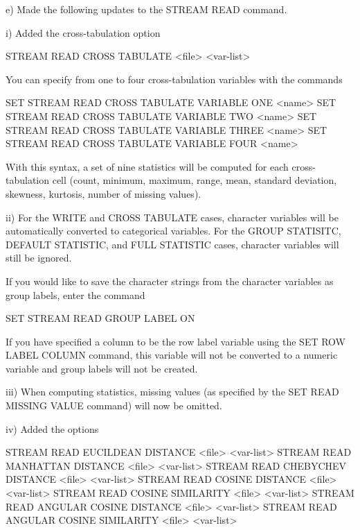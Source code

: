     e) Made the following updates to the STREAM READ command.

         i) Added the cross-tabulation option

               STREAM READ CROSS TABULATE <file>  <var-list>

            You can specify from one to four cross-tabulation variables
            with the commands

               SET STREAM READ CROSS TABULATE VARIABLE ONE <name>
               SET STREAM READ CROSS TABULATE VARIABLE TWO <name>
               SET STREAM READ CROSS TABULATE VARIABLE THREE <name>
               SET STREAM READ CROSS TABULATE VARIABLE FOUR <name>

            With this syntax, a set of nine statistics will be computed
            for each cross-tabulation cell (count, minimum, maximum,
            range, mean, standard deviation, skewness, kurtosis, number
            of missing values).

        ii) For the WRITE and CROSS TABULATE cases, character variables
            will be automatically converted to categorical variables.  For
            the GROUP STATISITC, DEFAULT STATISTIC, and FULL STATISTIC
            cases, character variables will still be ignored.

            If you would like to save the character strings from the
            character variables as group labels, enter the command

                SET STREAM READ GROUP LABEL ON

            If you have specified a column to be the row label variable
            using the SET ROW LABEL COLUMN command, this variable will
            not be converted to a numeric variable and group labels will
            not be created.

       iii) When computing statistics, missing values (as specified by the
            SET READ MISSING VALUE command) will now be omitted.

        iv) Added the options

                STREAM READ EUCILDEAN DISTANCE <file> <var-list>
                STREAM READ MANHATTAN DISTANCE <file> <var-list>
                STREAM READ CHEBYCHEV DISTANCE <file> <var-list>
                STREAM READ COSINE DISTANCE <file> <var-list>
                STREAM READ COSINE SIMILARITY <file> <var-list>
                STREAM READ ANGULAR COSINE DISTANCE <file> <var-list>
                STREAM READ ANGULAR COSINE SIMILARITY <file> <var-list>

